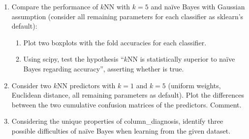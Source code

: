 \documentclass[12pt]{article}
\begin{document}
\begin{enumerate}[leftmargin=\labelsep]
    \item Compare the performance of $k$NN with $k = 5$ and naïve Bayes with Gaussian assumption
    (consider all remaining parameters for each classifier as sklearn's default):

    \begin{enumerate}
        \item Plot two boxplots with the fold accuracies for each classifier.
        \item Using scipy, test the hypothesis “$k$NN is statistically superior to naïve Bayes regarding
        accuracy”, asserting whether is true.
    \end{enumerate}

    \item Consider two $k$NN predictors with $k = 1$ and $k = 5$ (uniform weights, Euclidean distance,
    all remaining parameters as default). Plot the differences between the two cumulative confusion
    matrices of the predictors. Comment.

    \item Considering the unique properties of column\_diagnosis, identify three possible difficulties
    of naïve Bayes when learning from the given dataset.
\end{enumerate}
\end{document}
